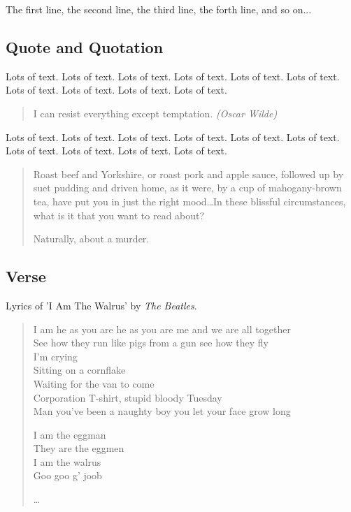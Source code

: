 \documentclass[english]{article}
\begin{document}
\begin{listing}[2]{2}
The first line,
the second line,
the third line,
the forth line,
and so on...
\end{listing}

\subsection{Quote and Quotation}

Lots of text. Lots of text. Lots of text. Lots of text. Lots of text.
Lots of text. Lots of text. Lots of text. Lots of text. Lots of text.

\begin{quote}
I can resist everything except temptation. \emph{(Oscar Wilde)}
\end{quote}

Lots of text. Lots of text. Lots of text. Lots of text. Lots of text.
Lots of text. Lots of text. Lots of text. Lots of text. Lots of text.
\begin{quotation} Roast beef and Yorkshire,
or roast pork and apple sauce, followed up by suet pudding and driven
home, as it were, by a cup of mahogany-brown tea, have put you in just
the right mood\ldots In these blissful circumstances, what is it that
you want to read about?

Naturally, about a murder.
\end{quotation}


\subsection{Verse}

Lyrics of 'I Am The Walrus' by \emph{The Beatles}.

\begin{verse}
I am he as you are he as you are me and we are all together \\
See how they run like pigs from a gun see how they fly \\
I'm crying \\
Sitting on a cornflake \\
Waiting for the van to come \\
Corporation T-shirt, stupid bloody Tuesday \\
Man you've been a naughty boy you let your face grow long

I am the eggman \\
They are the eggmen \\
I am the walrus \\
Goo goo g' joob

\ldots
\end{verse}
\end{document}
